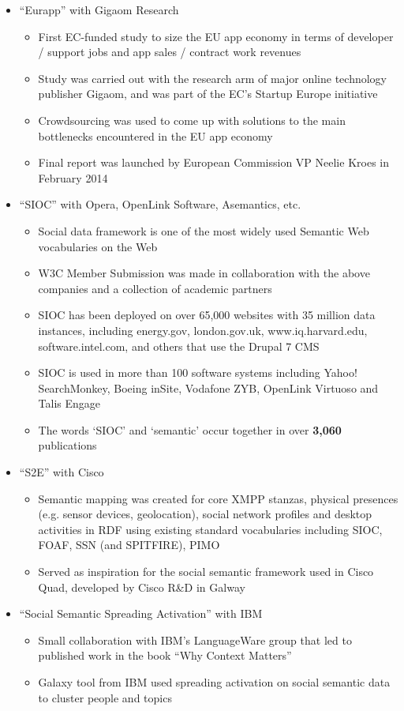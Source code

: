\documentclass[10pt,a4paper]{res} %
\begin{document}
\begin{resume}
\begin{itemize} \itemsep -2pt
\item ``Eurapp'' with Gigaom Research
\begin{itemize} \itemsep -2pt
\item First EC-funded study to size the EU app economy in terms of developer / support jobs and app sales / contract work revenues
\item Study was carried out with the research arm of major online technology publisher Gigaom, and was part of the EC's Startup Europe initiative
\item Crowdsourcing was used to come up with solutions to the main bottlenecks encountered in the EU app economy
\item Final report was launched by European Commission VP Neelie Kroes in February 2014
\end{itemize}
\item ``SIOC'' with Opera, OpenLink Software, Asemantics, etc.
\begin{itemize} \itemsep -2pt
\item Social data framework is one of the most widely used Semantic Web vocabularies on the Web
\item W3C Member Submission was made in collaboration with the above companies and a collection of academic partners
\item SIOC has been deployed on over 65,000 websites with 35 million data instances, including energy.gov, london.gov.uk, www.iq.harvard.edu, software.intel.com, and others that use the Drupal 7 CMS
\item SIOC is used in more than 100 software systems including Yahoo! SearchMonkey, Boeing inSite, Vodafone ZYB, OpenLink Virtuoso and Talis Engage
\item The words `SIOC' and `semantic' occur together in over \textbf{3,060} publications
\end{itemize}
\item ``S2E'' with Cisco
\begin{itemize} \itemsep -2pt
\item Semantic mapping was created for core XMPP stanzas, physical presences (e.g. sensor devices, geolocation), social network profiles and desktop activities in RDF using existing standard vocabularies including SIOC, FOAF, SSN (and SPITFIRE), PIMO
\item Served as inspiration for the social semantic framework used in Cisco Quad, developed by Cisco R\&D in Galway
\end{itemize}
\item ``Social Semantic Spreading Activation'' with IBM
\begin{itemize} \itemsep -2pt
\item Small collaboration with IBM's LanguageWare group that led to published work in the book ``Why Context Matters''
\item Galaxy tool from IBM used spreading activation on social semantic data to cluster people and topics
\end{itemize}
\end{itemize}


\end{resume}
\end{document}
